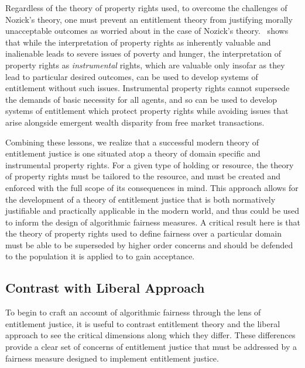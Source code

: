 Regardless of the theory of property rights used, to overcome the challenges of
Nozick's theory, one must prevent an entitlement theory from justifying morally
unacceptable outcomes as \cite{Fried_1995} worried about in the case of Nozick's
theory.~\cite{Sen_1988} shows that while the interpretation of property rights
as inherently valuable and inalienable leads to severe issues of poverty and
hunger, the interpretation of property rights as \textit{instrumental} rights,
which are valuable only insofar as they lead to particular desired outcomes,
can be used to develop systems of entitlement without such issues. Instrumental
property rights cannot supersede the demands of basic necessity for all agents,
and so can be used to develop systems of entitlement which protect property
rights while avoiding issues that arise alongside emergent wealth disparity from
free market transactions.

Combining these lessons, we realize that a successful modern theory of 
entitlement justice is one situated atop a theory of domain specific and 
instrumental property rights. For a given type of holding or resource, the
theory of property rights must be tailored to the resource, and must be created
and enforced with the full scope of its consequences in mind. This approach
allows for the development of a theory of entitlement justice that is both
normatively justifiable and practically applicable in the modern world, and
thus could be used to inform the design of algorithmic fairness measures. A
critical result here is that the theory of property rights used to define 
fairness over a particular domain must be able to be superseded by higher order
concerns and should be defended to the population it is applied to to gain 
acceptance.

\subsection{Contrast with Liberal Approach}

To begin to craft an account of algorithmic fairness through the lens of
entitlement justice, it is useful to contrast entitlement theory and the liberal
approach to see the critical dimensions along which they differ. These
differences provide a clear set of concerns of entitlement justice that must be
addressed by a fairness measure designed to implement entitlement justice.

